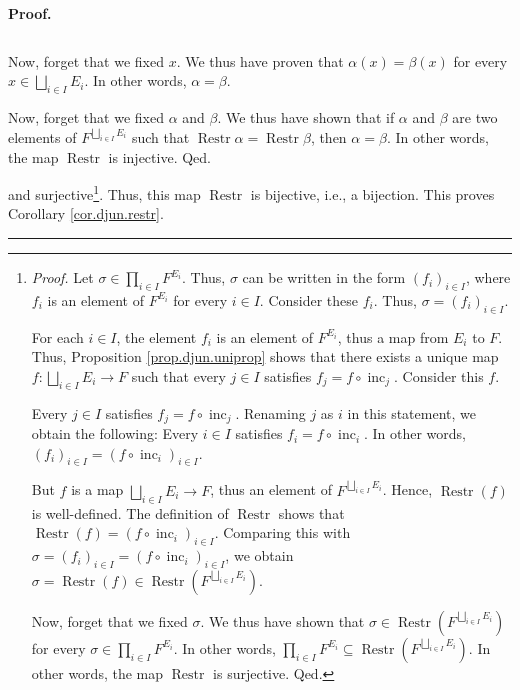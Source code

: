 \documentclass[numbers=enddot,12pt,final,onecolumn,notitlepage,abstracton]{scrartcl}
\theoremstyle{definition}
\newenvironment{proof}[1][Proof]{\noindent\textbf{#1.} }{\ \rule{0.5em}{0.5em}}
\let\prodnonlimits\prod
\renewcommand{\prod}{\prodnonlimits\limits}
\newenvironment{verlong}{}{}
\begin{document}
\begin{verlong}
\begin{footnotesize}
\begin{proof}
{\[\]
\par
Now, forget that we fixed $x$. We thus have proven that $\alpha\left(
x\right)  =\beta\left(  x\right)  $ for every $x\in\bigsqcup_{i\in I}E_{i}$.
In other words, $\alpha=\beta$.
\par
Now, forget that we fixed $\alpha$ and $\beta$. We thus have shown that if
$\alpha$ and $\beta$ are two elements of $F^{\bigsqcup_{i\in I}E_{i}}$ such
that $\operatorname*{Restr}\alpha=\operatorname*{Restr}\beta$, then
$\alpha=\beta$. In other words, the map $\operatorname*{Restr}$ is injective.
Qed.} and surjective\footnote{\textit{Proof.} Let $\sigma\in\prod_{i\in
I}F^{E_{i}}$. Thus, $\sigma$ can be written in the form $\left(  f_{i}\right)
_{i\in I}$, where $f_{i}$ is an element of $F^{E_{i}}$ for every $i\in I$.
Consider these $f_{i}$. Thus, $\sigma=\left(  f_{i}\right)  _{i\in I}$.
\par
For each $i\in I$, the element $f_{i}$ is an element of $F^{E_{i}}$, thus a
map from $E_{i}$ to $F$. Thus, Proposition \ref{prop.djun.uniprop} shows that
there exists a unique map $f:\bigsqcup_{i\in I}E_{i}\rightarrow F$ such that
every $j\in I$ satisfies $f_{j}=f\circ\operatorname*{inc}\nolimits_{j}$.
Consider this $f$.
\par
Every $j\in I$ satisfies $f_{j}=f\circ\operatorname*{inc}\nolimits_{j}$.
Renaming $j$ as $i$ in this statement, we obtain the following: Every $i\in I$
satisfies $f_{i}=f\circ\operatorname*{inc}\nolimits_{i}$. In other words,
$\left(  f_{i}\right)  _{i\in I}=\left(  f\circ\operatorname*{inc}%
\nolimits_{i}\right)  _{i\in I}$.
\par
But $f$ is a map $\bigsqcup_{i\in I}E_{i}\rightarrow F$, thus an element of
$F^{\bigsqcup_{i\in I}E_{i}}$. Hence, $\operatorname*{Restr}\left(  f\right)
$ is well-defined. The definition of $\operatorname*{Restr}$ shows that
$\operatorname*{Restr}\left(  f\right)  =\left(  f\circ\operatorname*{inc}%
\nolimits_{i}\right)  _{i\in I}$. Comparing this with $\sigma=\left(
f_{i}\right)  _{i\in I}=\left(  f\circ\operatorname*{inc}\nolimits_{i}\right)
_{i\in I}$, we obtain $\sigma=\operatorname*{Restr}\left(  f\right)
\in\operatorname*{Restr}\left(  F^{\bigsqcup_{i\in I}E_{i}}\right)  $.
\par
Now, forget that we fixed $\sigma$. We thus have shown that $\sigma
\in\operatorname*{Restr}\left(  F^{\bigsqcup_{i\in I}E_{i}}\right)  $ for
every $\sigma\in\prod_{i\in I}F^{E_{i}}$. In other words, $\prod_{i\in
I}F^{E_{i}}\subseteq\operatorname*{Restr}\left(  F^{\bigsqcup_{i\in I}E_{i}%
}\right)  $. In other words, the map $\operatorname*{Restr}$ is surjective.
Qed.}. Thus, this map $\operatorname*{Restr}$ is bijective, i.e., a bijection.
This proves Corollary \ref{cor.djun.restr}.
\end{proof}


\end{footnotesize}
\end{verlong}
\end{document}
